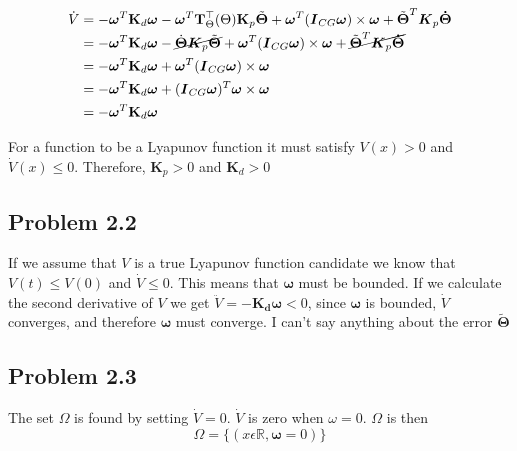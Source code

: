 \begin{equation}
\begin{align}
    \dot{V} &=   -\boldsymbol{\omega}^T\mathbf{K}_d \boldsymbol{\omega} -\boldsymbol{\omega}^T\mathbf{T}_{\Theta}^{\top}(\Theta) \mathbf{K}_p \tilde{\boldsymbol{\Theta}} + \boldsymbol{\omega}^T(\boldsymbol{I}_{CG}\boldsymbol{\omega})\times \boldsymbol{\omega}  + \tilde{\boldsymbol{\Theta}}^T\boldsymbol{K}_p\boldsymbol{\dot{\Theta}}\\
    &= -\boldsymbol{\omega}^T\mathbf{K}_d \boldsymbol{\omega} - \cancel{\dot{\boldsymbol{\Theta}} \boldsymbol{K}_p \tilde{\boldsymbol{\Theta}}} + \boldsymbol{\omega}^T(\boldsymbol{I}_{CG}\boldsymbol{\omega})\times \boldsymbol{\omega}  + \cancel{\tilde{\boldsymbol{\Theta}}^T\boldsymbol{K}_p\boldsymbol{\dot{\Theta}}}\\
    &=-\boldsymbol{\omega}^T\mathbf{K}_d \boldsymbol{\omega} + \boldsymbol{\omega}^T(\boldsymbol{I}_{CG}\boldsymbol{\omega})\times \boldsymbol{\omega}\\
    &= -\boldsymbol{\omega}^T\mathbf{K}_d \boldsymbol{\omega} + (\boldsymbol{I}_{CG}\boldsymbol{\omega})^T\boldsymbol{\omega}\times \boldsymbol{\omega}
     \\&=-\boldsymbol{\omega}^T\mathbf{K}_d \boldsymbol{\omega}
\end{align}
\end{equation}

For a function to be a Lyapunov function it must satisfy $V(x)>0$ and $\dot{V}(x)\le 0$. Therefore, $\boldsymbol{K}_p>0$ and $\boldsymbol{K}_d > 0$ 

\subsection*{Problem 2.2}

If we assume that $V$ is a true Lyapunov function candidate we know that \\$V(t)\le V(0)$ and $\dot{V} \le 0$. This means that $\boldsymbol{\omega}$ must be bounded. If we calculate the second derivative of $V$ we get $\ddot{V} = -\boldsymbol{K_d\omega}< 0$, since $\boldsymbol{\omega}$ is bounded, $\dot{V}$ converges, and therefore $\boldsymbol{\omega}$ must converge.
I can't say anything about the error $\boldsymbol{\tilde{\Theta}}$ %

\subsection*{Problem 2.3}
The set $\Omega$ is found by setting $\dot{V}=0$. $\dot{V}$ is zero when $\omega = 0$. $\Omega$ is then 
\begin{equation}
\Omega = \{ (x\epsilon \mathbb{R},\boldsymbol{\omega}=0) \}
\end{equation}

